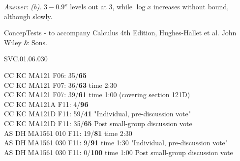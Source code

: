 {\it Answer: (b).} $3-0.9^x$ levels out at 3, while $\log x$ increases without bound, although slowly.


\medskip
ConcepTests - to accompany Calculus 4th Edition, Hughes-Hallet et al. John Wiley \& Sons.

SVC.01.06.030


CC KC MA121 F06: 35/{\bf 65} \\
CC KC MA121 F07: 36/{\bf 63} time 2:30 \\
CC KC MA121 F07: 39/{\bf 61} time 1:00 (covering section 121D) \\
CC KC MA121A F11: 4/{\bf96}  \\
CC KC MA121D F11: 59/{\bf41} "Individual, pre-discussion vote" \\
CC KC MA121D F11: 35/{\bf65} Post small-group discussion vote \\
AS DH MA1561 010 F11: 19/{\bf81} time 2:30  \\
AS DH MA1561 030 F11: 9/{\bf91} time 1:30 "Individual, pre-discussion vote" \\
AS DH MA1561 030 F11: 0/{\bf100} time 1:00 Post small-group discussion vote \\
